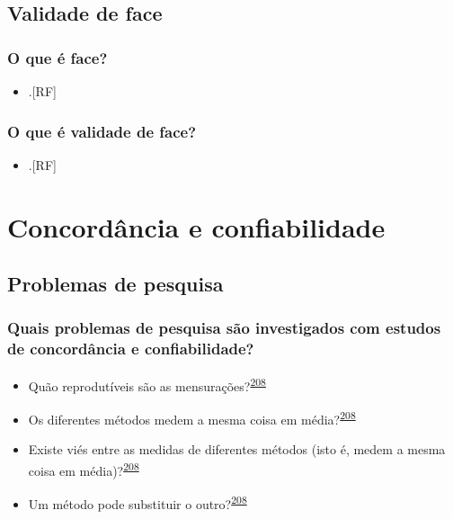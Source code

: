 \documentclass[
  a4paper,
]{book}
\providecommand{\tightlist}{%
  \setlength{\itemsep}{0pt}\setlength{\parskip}{0pt}}
\begin{document}
\hypertarget{validade-face}{%
\section{Validade de face}\label{validade-face}}

\hypertarget{o-que-uxe9-face}{%
\subsection{O que é face?}\label{o-que-uxe9-face}}

\begin{itemize}
\tightlist
\item
  .{[}RF{]}
\end{itemize}

\hypertarget{o-que-uxe9-validade-de-face}{%
\subsection{O que é validade de face?}\label{o-que-uxe9-validade-de-face}}

\begin{itemize}
\tightlist
\item
  .{[}RF{]}
\end{itemize}

\hypertarget{analise-concordancia-confiabilidade}{%
\chapter{\texorpdfstring{\textbf{Concordância e confiabilidade}}{Concordância e confiabilidade}}\label{analise-concordancia-confiabilidade}}

\hypertarget{problemas}{%
\section{Problemas de pesquisa}\label{problemas}}

\hypertarget{quais-problemas-de-pesquisa-suxe3o-investigados-com-estudos-de-concorduxe2ncia-e-confiabilidade}{%
\subsection{Quais problemas de pesquisa são investigados com estudos de concordância e confiabilidade?}\label{quais-problemas-de-pesquisa-suxe3o-investigados-com-estudos-de-concorduxe2ncia-e-confiabilidade}}

\begin{itemize}
\item
  Quão reprodutíveis são as mensurações?\textsuperscript{\protect\hyperlink{ref-altman1983}{208}}
\item
  Os diferentes métodos medem a mesma coisa em média?\textsuperscript{\protect\hyperlink{ref-altman1983}{208}}
\item
  Existe viés entre as medidas de diferentes métodos (isto é, medem a mesma coisa em média)?\textsuperscript{\protect\hyperlink{ref-altman1983}{208}}
\item
  Um método pode substituir o outro?\textsuperscript{\protect\hyperlink{ref-altman1983}{208}}
\end{itemize}
\end{document}
